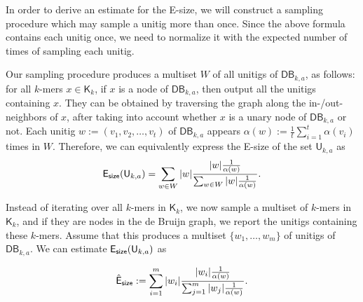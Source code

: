 \documentclass[a4paper,11pt]{article}
\newcommand{\DB}{\mathsf{DB}_{k,a}}
\newcommand{\U}{\mathsf{U}_{k,a}}
\newcommand{\K}{\mathsf{K}}
\newcommand{\esize}{{\sf E_{size}}}
\begin{document}
In order to derive an estimate for the E-size, we will construct a sampling procedure which may sample a unitig more than once. Since the above formula contains each unitig once, we need to normalize it with the expected number of times of sampling each unitig.

Our sampling procedure produces a multiset $W$ of all unitigs of $\DB$, as follows: for all $k$-mers $x \in \K_k$, if $x$ is a node of $\DB$, then output all the unitigs containing $x$. They can be obtained by traversing the graph along the in-/out-neighbors of $x$, after taking into account whether $x$ is a unary node of $\DB$ or not. Each unitig $w := (v_1,v_2,\dots,v_t)$ of $\DB$ appears $\alpha(w) := \frac{1}{t}\sum_{i = 1}^{t}\alpha(v_i)$ times in $W$. Therefore, we can equivalently express the E-size of the set $\U$ as 
\[\esize(\U) = \sum_{w \in W} |w| \frac{|w|\frac{1}{\alpha(w)}}{\sum_{w \in W}|w|\frac{1}{\alpha(w)}}.\]

Instead of iterating over all $k$-mers in $\K_k$, we now sample a multiset of $k$-mers in $\K_k$, and if they are nodes in the de Bruijn graph, we report the unitigs containing these $k$-mers. Assume that this produces a multiset $\{w_1,\dots,w_m\}$ of unitigs of $\DB$. We can estimate $\esize(\U)$ as 

\[\hat{{\sf E}}_{\sf size} := \sum_{i = 1}^{m} |w_i| \frac{|w_i|\frac{1}{\alpha(w)}}{\sum_{j=1}^{m}|w_j|\frac{1}{\alpha(w)}}.\]





\end{document}
